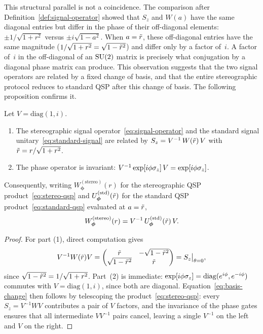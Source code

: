 This structural parallel is not a coincidence.  The comparison
after Definition~\ref{def:signal-operator} showed that $S_z$
and $W(a)$ have the same diagonal entries but differ in the
phase of their off-diagonal elements: $\pm 1/\sqrt{1+r^2}$
versus $\pm i\sqrt{1-a^2}$.  When $a = \tilde{r}$, these
off-diagonal entries have the same magnitude
($1/\sqrt{1+r^2} = \sqrt{1-\tilde{r}^2}$) and differ only by a
factor of~$i$.  A factor of~$i$ in the off-diagonal of an
$\mathrm{SU}(2)$ matrix is precisely what conjugation by a diagonal
phase matrix can produce.  This observation suggests that the
two signal operators are related by a fixed change of basis,
and that the entire stereographic protocol reduces to standard
QSP after this change of basis.  The following proposition
confirms it.

\begin{proposition}
	\label{prop:basis-change}
	Let $V = \mathrm{diag}(1,i)$.
	\begin{enumerate}
		\item The stereographic signal operator~\eqref{eq:signal-operator} and the standard signal unitary~\eqref{eq:standard-signal} are related by $S_z = V^{-1}\,W(\tilde{r})\,V$ with $\tilde{r} = r/\sqrt{1+r^2}$.
		\item The phase operator is invariant: $V^{-1}\exp[i\phi\sigma_z]\,V = \exp[i\phi\sigma_z]$.
	\end{enumerate}
	Consequently, writing $W_{\bm{\phi}}^{\mathrm{(stereo)}}(r)$ for the stereographic QSP product~\eqref{eq:stereo-qsp} and $U_{\bm{\phi}}^{\mathrm{(std)}}(\tilde{r})$ for the standard QSP product~\eqref{eq:standard-qsp} evaluated at $a = \tilde{r}$,
	\begin{equation}
		W_{\bm{\phi}}^{\mathrm{(stereo)}}(r) = V^{-1}\,U_{\bm{\phi}}^{\mathrm{(std)}}(\tilde{r})\,V.
		\label{eq:basis-change}
	\end{equation}
\end{proposition}

\begin{proof}
	For part (1), direct computation gives
	\begin{equation*}
		V^{-1}W(\tilde{r})V = \begin{pmatrix} \tilde{r} & -\sqrt{1-\tilde{r}^2} \\ \sqrt{1-\tilde{r}^2} & \tilde{r}\end{pmatrix} = S_z\big|_{\theta=0},
	\end{equation*}
	since $\sqrt{1-\tilde{r}^2} = 1/\sqrt{1+r^2}$. Part~(2) is
	immediate: $\exp[i\phi\sigma_z] = \mathrm{diag}(e^{i\phi},
		e^{-i\phi})$ commutes with $V = \mathrm{diag}(1, i)$, since
	both are diagonal.
	Equation~\eqref{eq:basis-change} then follows by
	telescoping the product~\eqref{eq:stereo-qsp}: every
	$S_z = V^{-1}WV$ contributes a pair of $V$ factors, and
	the invariance of the phase gates ensures that all
	intermediate $VV^{-1}$ pairs cancel, leaving a single
	$V^{-1}$ on the left and $V$ on the right.
\end{proof}

